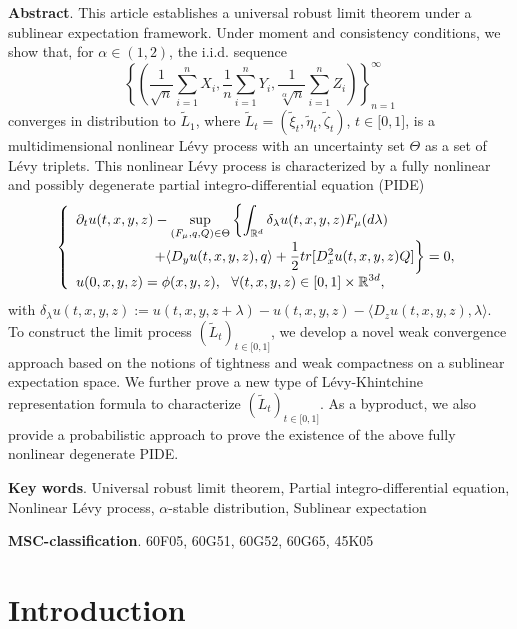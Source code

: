 \documentclass[a4paper,oneside,10pt]{article}%
\numberwithin{equation}{section}
\begin{document}
\textbf{Abstract}. This article establishes a universal robust limit theorem
under a sublinear expectation framework. Under moment and consistency
conditions, we show that, for $\alpha \in(1,2)$, the i.i.d. sequence
\[
\left \{  \left(  \frac{1}{\sqrt{n}}\sum_{i=1}^{n}X_{i},\frac{1}{n}\sum
_{i=1}^{n}Y_{i},\frac{1}{\sqrt[\alpha]{n}}\sum_{i=1}^{n}Z_{i}\right)
\right \}  _{n=1}^{\infty}%
\]
converges in distribution to $\tilde{L}_{1}$, where $\tilde{L}_{t}=(\tilde
{\xi}_{t},\tilde{\eta}_{t},\tilde{\zeta}_{t})$, $t\in \lbrack0,1]$, is a
multidimensional nonlinear L\'{e}vy process with an uncertainty set $\Theta$
as a set of L\'{e}vy triplets. This nonlinear L\'{e}vy process is
characterized by a fully nonlinear and possibly degenerate partial
integro-differential equation (PIDE)
\[
\left \{
\begin{array}
[c]{l}%
\displaystyle \partial_{t}u(t,x,y,z)-\sup \limits_{(F_{\mu},q,Q)\in \Theta
}\left \{  \int_{\mathbb{R}^{d}}\delta_{\lambda}u(t,x,y,z)F_{\mu}
(d\lambda)\right. \\
\displaystyle \text{\  \  \  \  \  \  \  \  \  \  \  \  \  \  \  \ }\left.  +\langle
D_{y}u(t,x,y,z),q\rangle+\frac{1}{2}tr[D_{x}^{2}u(t,x,y,z)Q]\right \}  =0,\\
\displaystyle u(0,x,y,z)=\phi(x,y,z),\  \  \forall(t,x,y,z)\in \lbrack
0,1]\times \mathbb{R}^{3d},
\end{array}
\right.
\]
with $\delta_{\lambda}u(t,x,y,z):=u(t,x,y,z+\lambda)-u(t,x,y,z)-\langle
D_{z}u(t,x,y,z),\lambda \rangle$. To construct the limit process $(\tilde
{L}_{t})_{t\in \lbrack0,1]}$, we develop a novel weak convergence approach
based on the notions of tightness and weak compactness on a sublinear
expectation space. We further prove a new type of L\'{e}vy-Khintchine
representation formula to characterize $(\tilde{L}_{t})_{t\in \lbrack0,1]}$. As
a byproduct, we also provide a probabilistic approach to prove the existence
of the above fully nonlinear degenerate PIDE. \newline

\textbf{Key words}. Universal robust limit theorem, Partial
integro-differential equation, Nonlinear L\'{e}vy process, $\alpha$-stable
distribution, Sublinear expectation\newline

\textbf{MSC-classification}. 60F05, 60G51, 60G52, 60G65, 45K05

\section{Introduction}
\end{document}
